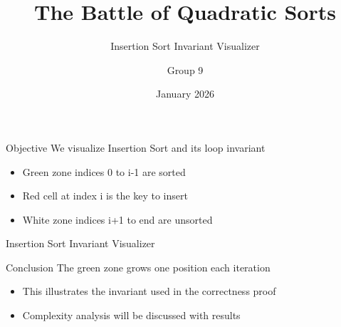 \documentclass{beamer}
\title{The Battle of Quadratic Sorts}
\subtitle{Insertion Sort Invariant Visualizer}
\author{Group 9}
\institute{Sorbonne University Abu Dhabi}
\date{January 2026}
\begin{document}
\begin{frame}
  \titlepage
\end{frame}

\begin{frame}{Objective}
We visualize Insertion Sort and its loop invariant
\begin{itemize}
  \item Green zone indices 0 to i-1 are sorted
  \item Red cell at index i is the key to insert
  \item White zone indices i+1 to end are unsorted
\end{itemize}
\end{frame}

\begin{frame}{Insertion Sort Invariant Visualizer}



\end{frame}

\begin{frame}{Conclusion}
The green zone grows one position each iteration
\begin{itemize}
  \item This illustrates the invariant used in the correctness proof
  \item Complexity analysis will be discussed with results
\end{itemize}
\end{frame}
\end{document}
